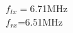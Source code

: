 \documentclass[preview]{standalone}
\begin{document}
\begin{center}
$f_{tx}=$6.71MHz\\$f_{rx}$=6.51MHz
\end{center}
\end{document}
